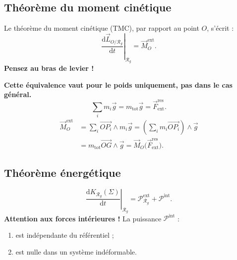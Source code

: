 \documentclass[11pt,a4paper]{article}
\newcommand{\dd}{\mathrm d}
\newcommand{\RR}{\mathcal R}
\begin{document}
\subsection{Théorème du moment cinétique}
Le théorème du moment cinétique (TMC), par rapport au point $O$, s'écrit :
\[\left.\frac{\dd\vec L_{O/\RR_g}}{\dd t}\right|_{\RR_g}=\vec M_O^{\mathrm{ext}}.\]
\textbf{Pensez au bras de levier !}
\begin{center}\end{center}
\textbf{Cette équivalence vaut pour le poids uniquement, pas dans le cas général.}
\[\sum_i m_i\vec g=m_{\mathrm{tot}}\vec g=\vec F_{\mathrm{ext}}^{\mathrm{res}}.\]
\begin{align*}
\vec M_O^{\mathrm{ext}}&=\sum_i\overrightarrow{OP_i}\wedge m_i\vec g
=\left(\sum_i m_i\overrightarrow{OP_i}\right)\wedge\vec g\\
&=m_{\mathrm{tot}}\overrightarrow{OG}\wedge\vec g
=\vec M_O\bigl(\vec F_{\mathrm{ext}}^{\mathrm{res}}\bigr).
\end{align*}
\subsection{Théorème énergétique}
\[\left.\frac{\dd K_{\RR_g}(\Sigma)}{\dd t}\right|_{\RR_g}
=\mathcal P_{\RR_g}^{\mathrm{ext}}+\mathcal P^{\mathrm{int}}.\]
\textbf{Attention aux forces intérieures !} La puissance $\mathcal P^{\mathrm{int}}$ :
\begin{enumerate}
\item est indépendante du référentiel ;
\item est nulle dans un système indéformable.
\end{enumerate}
\end{document}
